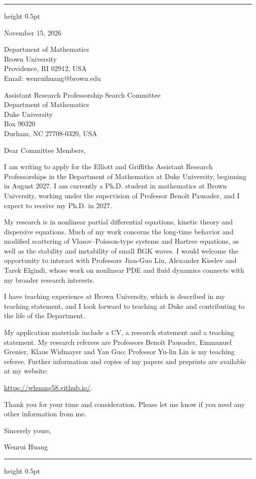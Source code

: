 \documentclass[10pt]{article}
\begin{document}
\vspace{0.08in}
\hrule height 0.5pt

\vspace{0.47in}
\hfill
\begin{minipage}{2.27in}
November 15, 2026

\vspace{0.16in}
Department of Mathematics\\
Brown University\\
Providence, RI 02912, USA\\
Email: wenrui\textunderscore huang@brown.edu
\end{minipage}

\vspace{0.30in}
Assistant Research Professorship Search Committee\\
Department of Mathematics\\
Duke University\\
Box 90320\\
Durham, NC 27708-0320, USA

\vspace{0.16in}
Dear Committee Members,

I am writing to apply for the Elliott and Griffiths Assistant Research Professorships in the Department of Mathematics at Duke University, beginning in August 2027. I am currently a Ph.D. student in mathematics at Brown University, working under the supervision of Professor Beno\^{i}t Pausader, and I expect to receive my Ph.D. in 2027.

My research is in nonlinear partial differential equations, kinetic theory and dispersive equations. Much of my work concerns the long-time behavior and modified scattering of Vlasov--Poisson-type systems and Hartree equations, as well as the stability and instability of small BGK waves. I would welcome the opportunity to interact with Professors Jian-Guo Liu, Alexander Kiselev and Tarek Elgindi, whose work on nonlinear PDE and fluid dynamics connects with my broader research interests.

I have teaching experience at Brown University, which is described in my teaching statement, and I look forward to teaching at Duke and contributing to the life of the Department.

My application materials include a CV, a research statement and a teaching statement. My research referees are Professors Beno\^{i}t Pausader, Emmanuel Grenier, Klaus Widmayer and Yan Guo; Professor Yu-lin Lin is my teaching referee. Further information and copies of my papers and preprints are available at my website:

\url{https://whuang58.github.io/}.

\medskip
Thank you for your time and consideration. Please let me know if you need any other information from me.

\vspace{0.12in}
Sincerely yours,

\vspace{0.12in}
Wenrui Huang

\vfill
\hrule height 0.5pt
\end{document}
